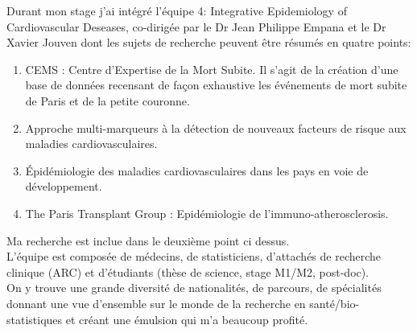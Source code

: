 \documentclass{book}
\begin{document}
\noindent
Durant mon stage j'ai intégré l'équipe 4: Integrative Epidemiology of Cardiovascular Deseases, co-dirigée par le Dr Jean Philippe Empana et le Dr Xavier Jouven dont les sujets de recherche peuvent être résumés en quatre points:
\noindent
\begin{enumerate}
\item CEMS : Centre d'Expertise de la Mort Subite. Il s'agit de la création d'une base de données recensant de façon exhaustive les événements de mort subite de Paris et de la petite couronne.\\
\item Approche multi-marqueurs à la détection de nouveaux facteurs de risque aux maladies cardiovasculaires.\\
\item Épidémiologie des maladies cardiovasculaires dans les pays en voie de développement.\\
\item The Paris Transplant Group : Epidémiologie de l'immuno-atherosclerosis.\\
\end{enumerate}

Ma recherche est inclue dans le deuxième point ci dessus.\\

\noindent
L'équipe est composée de médecins, de statisticiens, d'attachés de recherche clinique (ARC) et d'étudiants (thèse de science, stage M1/M2, post-doc).\\
On y trouve une grande diversité de nationalités, de parcours, de spécialités donnant une vue d'ensemble sur le monde de la recherche en santé/bio-statistiques et créant une émulsion qui m'a beaucoup profité.\\

\end{document}
